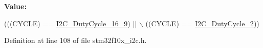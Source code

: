 {\bfseries Value\+:}
\begin{DoxyCode}
(((CYCLE) == \hyperlink{group___i2_c__duty__cycle__in__fast__mode_ga2b4ff186808a8095fc2d1b8193f30ce1}{I2C\_DutyCycle\_16\_9}) || \(\backslash\)
                                  ((CYCLE) == \hyperlink{group___i2_c__duty__cycle__in__fast__mode_gafe0af31970aceef0fa8df6a10bef35db}{I2C\_DutyCycle\_2}))
\end{DoxyCode}


Definition at line 108 of file stm32f10x\+\_\+i2c.\+h.

